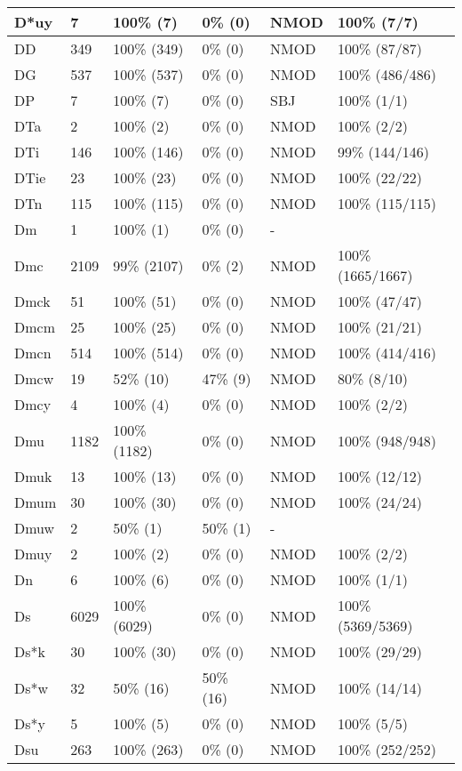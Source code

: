 \begin{figure*}
\begin{tabular}{|l|l|l|l||l|l|}
\hline
 D*uy & 7 & 100\% (7) & 0\% (0) & NMOD & 100\% (7/7) \\ 
\hline
 DD & 349 & 100\% (349) & 0\% (0) & NMOD & 100\% (87/87) \\ 
\hline
 DG & 537 & 100\% (537) & 0\% (0) & NMOD & 100\% (486/486) \\ 
\hline
 DP & 7 & 100\% (7) & 0\% (0) & SBJ & 100\% (1/1) \\ 
\hline
 DTa & 2 & 100\% (2) & 0\% (0) & NMOD & 100\% (2/2) \\ 
\hline
 DTi & 146 & 100\% (146) & 0\% (0) & NMOD & 99\% (144/146) \\ 
\hline
 DTie & 23 & 100\% (23) & 0\% (0) & NMOD & 100\% (22/22) \\ 
\hline
 DTn & 115 & 100\% (115) & 0\% (0) & NMOD & 100\% (115/115) \\ 
\hline
 Dm & 1 & 100\% (1) & 0\% (0) & - &  \\ 
\hline
 Dmc & 2109 & 99\% (2107) & 0\% (2) & NMOD & 100\% (1665/1667) \\ 
\hline
 Dmck & 51 & 100\% (51) & 0\% (0) & NMOD & 100\% (47/47) \\ 
\hline
 Dmcm & 25 & 100\% (25) & 0\% (0) & NMOD & 100\% (21/21) \\ 
\hline
 Dmcn & 514 & 100\% (514) & 0\% (0) & NMOD & 100\% (414/416) \\ 
\hline
 Dmcw & 19 & 52\% (10) & 47\% (9) & NMOD & 80\% (8/10) \\ 
\hline
 Dmcy & 4 & 100\% (4) & 0\% (0) & NMOD & 100\% (2/2) \\ 
\hline
 Dmu & 1182 & 100\% (1182) & 0\% (0) & NMOD & 100\% (948/948) \\ 
\hline
 Dmuk & 13 & 100\% (13) & 0\% (0) & NMOD & 100\% (12/12) \\ 
\hline
 Dmum & 30 & 100\% (30) & 0\% (0) & NMOD & 100\% (24/24) \\ 
\hline
 Dmuw & 2 & 50\% (1) & 50\% (1) & - &  \\ 
\hline
 Dmuy & 2 & 100\% (2) & 0\% (0) & NMOD & 100\% (2/2) \\ 
\hline
 Dn & 6 & 100\% (6) & 0\% (0) & NMOD & 100\% (1/1) \\ 
\hline
 Ds & 6029 & 100\% (6029) & 0\% (0) & NMOD & 100\% (5369/5369) \\ 
\hline
 Ds*k & 30 & 100\% (30) & 0\% (0) & NMOD & 100\% (29/29) \\ 
\hline
 Ds*w & 32 & 50\% (16) & 50\% (16) & NMOD & 100\% (14/14) \\ 
\hline
 Ds*y & 5 & 100\% (5) & 0\% (0) & NMOD & 100\% (5/5) \\ 
\hline
 Dsu & 263 & 100\% (263) & 0\% (0) & NMOD & 100\% (252/252) \\ 
\hline
\end{tabular}
\end{figure*}
